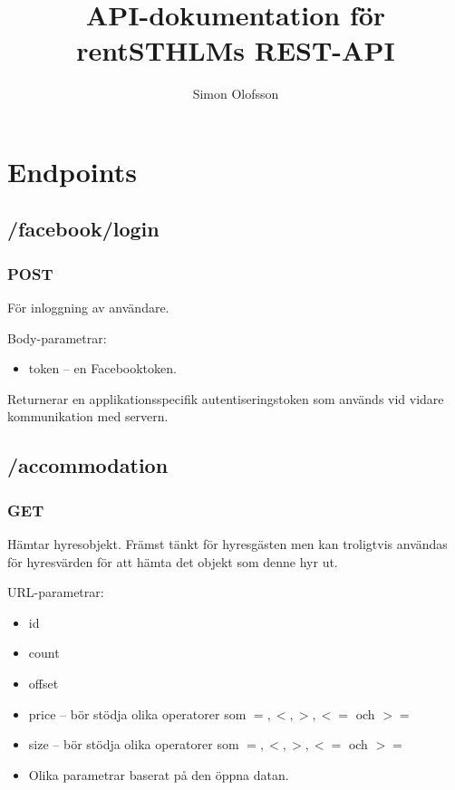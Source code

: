 \documentclass{article}
\title{API-dokumentation för rentSTHLMs REST-API}
\author{Simon Olofsson}
\date{}
\begin{document}

\maketitle

\newpage

\tableofcontents

\newpage

\section {Endpoints}
\label{sec:Endpoints}

\subsection{/facebook/login}
\label{sub:_facebook_login}

\subsubsection {POST}
\label{ssub:POST}

För inloggning av användare.

Body-parametrar:

\begin{itemize}
    \item token -- en Facebooktoken.
\end{itemize}

Returnerar en applikationsspecifik autentiseringstoken som används vid vidare kommunikation med servern.

\subsection {/accommodation}
\label{sub:/accommodation}

\subsubsection {GET}
\label{ssub:GET}

Hämtar hyresobjekt. Främst tänkt för hyresgästen men kan troligtvis användas för hyresvärden för att hämta det objekt som denne hyr ut.

URL-parametrar:

\begin{itemize}
    \item id
    \item count
    \item offset
    \item price -- bör stödja olika operatorer som \(=, <, >, <=\) och \(>=\)
    \item size -- bör stödja olika operatorer som \(=, <, >, <=\) och \(>=\)
    \item Olika parametrar baserat på den öppna datan.
\end{itemize}
\end{document}
